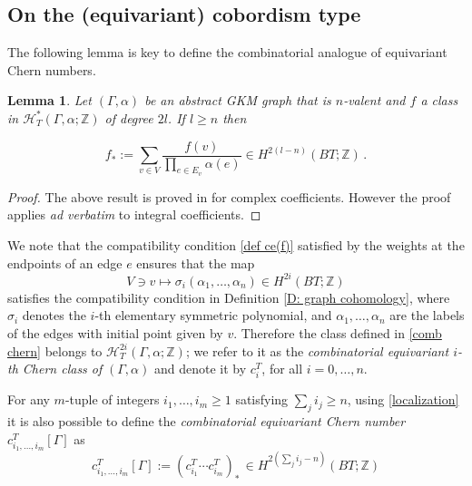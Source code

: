 \documentclass[12pt,a4paper]{amsart}
\newcommand{\ZZ}{\mathbb{Z}}
\theoremstyle{plain}
\newtheorem{lemma}[thm]{Lemma}
\theoremstyle{definition}
\begin{document}
\subsection{On the (equivariant) cobordism type}
The following lemma is key to define the combinatorial analogue of equivariant Chern numbers.
\begin{lemma}\label{ABBV integers}
Let $(\Gamma,\alpha)$ be an abstract GKM graph that is $n$-valent and $f$ a class in
$\mathcal{H}^*_T(\Gamma, \alpha;\ZZ)$ of degree $2l$. If $l\geq n$ then
\end{lemma}
\begin{equation}\label{localization}
f_*:=\sum_{v\in V} \frac{f(v)}{\prod_{e\in E_v}\alpha(e)}\in H^{2(l-n)}(BT;\ZZ)\,.
\end{equation}
\begin{proof}
The above result is proved in \cite[Theorem 2.2]{MR1701922} 
for complex coefficients. However the proof applies \emph{ad verbatim} to integral coefficients.
\end{proof}
We note that the compatibility condition \eqref{def ce(f)} satisfied by the weights
 at the endpoints of an edge $e$ ensures that the map
 \begin{equation}\label{comb chern}
 V \ni v\mapsto \sigma_i(\alpha_1,\ldots,\alpha_n)\in H^{2i}(BT;\ZZ)
 \end{equation}
 satisfies the compatibility condition in Definition \ref{D: graph cohomology}, where $\sigma_i$ denotes the $i$-th elementary symmetric polynomial, and 
 $\alpha_1,\ldots,\alpha_n$ are the labels of the edges with initial point given by $v$. Therefore the class defined in \eqref{comb chern} belongs to 
 $\mathcal{H}^{2i}_T(\Gamma, \alpha;\ZZ)$; we refer to it as the \emph{combinatorial equivariant $i$-th Chern class of }$(\Gamma,\alpha)$ and denote it by $c^T_i$, for all $i=0,\ldots,n$.
 
For any $m$-tuple of integers $i_1,\ldots,i_m\geq 1$ satisfying $\sum_j i_j\geq n$, using \eqref{localization} it is also possible to define
 the \emph{combinatorial equivariant Chern number} $c^T_{i_1,\ldots,i_m}[\Gamma]$ as 
 \begin{equation}\label{comb chern numbers}
 c^T_{i_1,\ldots,i_m}[\Gamma]:=(c^T_{i_1}\cdots c^T_{i_m})_*\,\in H^{2(\sum_j  i_j-n)}(BT;\ZZ)
 \end{equation}
\end{document}
